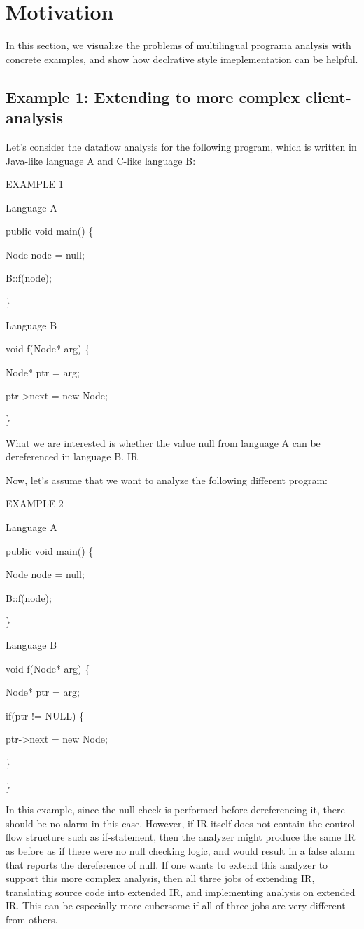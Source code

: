 \section{Motivation}

In this section, we visualize the problems of multilingual programa analysis
with concrete examples, and show how declrative style imeplementation can be helpful.

\subsection{Example 1: Extending to more complex client-analysis}

Let's consider the dataflow analysis for the following program,
which is written in Java-like language A and C-like language B:

EXAMPLE 1

Language A

public void main() \{

  Node node = null;
 
  B::f(node);

\}

Language B

void f(Node* arg) \{
  
  Node* ptr = arg;

  ptr->next = new Node;

\}

What we are interested is whether the value null from language A
can be dereferenced in language B. IR~~~

Now, let's assume that we want to analyze the following different program:

EXAMPLE 2

Language A

public void main() \{

  Node node = null;
 
  B::f(node);

\}

Language B

void f(Node* arg) \{

  Node* ptr = arg;
  
  if(ptr != NULL) \{

    ptr->next = new Node;

  \}

\}

In this example, since the null-check is performed before dereferencing it,
there should be no alarm in this case. However, if IR itself does not contain
the control-flow structure such as if-statement, then the analyzer might
produce the same IR as before as if there were no null checking logic, and
would result in a false alarm that reports the dereference of null. If one
wants to extend this analyzer to support this more complex analysis, then all
three jobs of extending IR, translating source code into extended IR, and
implementing analysis on extended IR. This can be especially more cubersome
if all of three jobs are very different from others.

